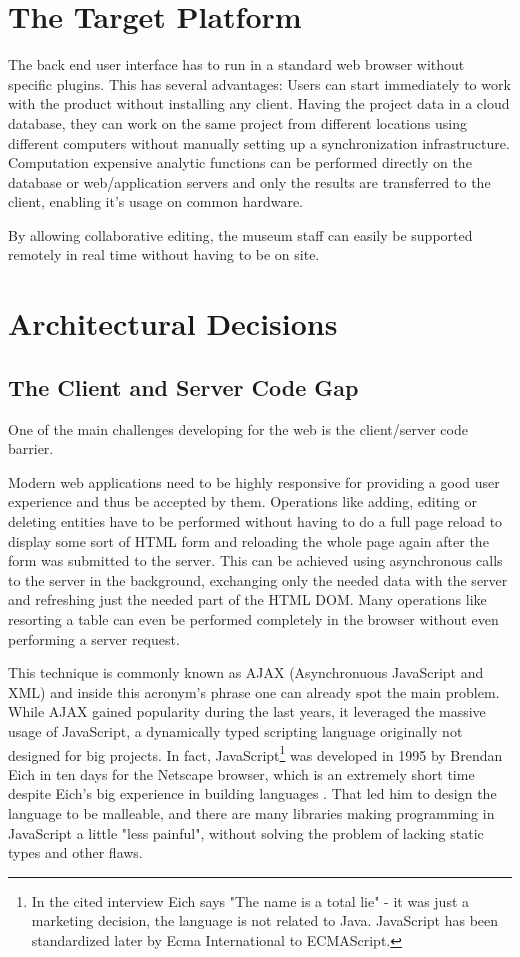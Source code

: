 
\section{The Target Platform}

The back end user interface has to run in a standard web browser without specific plugins. This has several advantages: Users can start immediately to work with the product without installing any client. Having the project data in a cloud database, they can work on the same project from different locations using different computers without manually setting up a synchronization infrastructure. Computation expensive analytic functions can be performed directly on the database or web/application servers and only the results are transferred to the client, enabling it's usage on common hardware.

By allowing collaborative editing, the museum staff can easily be supported remotely in real time without having to be on site.

\section{Architectural Decisions}

\subsection{The Client and Server Code Gap}
One of the main challenges developing for the web is the client/server code barrier. 

Modern web applications need to be highly responsive for providing a good user experience and thus be accepted by them. Operations like adding, editing or deleting entities have to be performed without having to do a full page reload to display some sort of HTML form and reloading the whole page again after the form was submitted to the server. This can be achieved using asynchronous calls to the server in the background, exchanging only the needed data with the server and refreshing just the needed part of the HTML DOM. Many operations like resorting a table can even be performed completely in the browser without even performing a server request.

This technique is commonly known as AJAX (Asynchronuous JavaScript and XML) and inside this acronym's phrase one can already spot the main problem. While AJAX gained popularity during the last years, it leveraged the massive usage of JavaScript, a dynamically typed scripting language originally not designed for big projects. In fact, JavaScript\footnote{In the cited interview Eich says "The name is a total lie" - it was just a marketing decision, the language is not related to Java. JavaScript has been standardized later by Ecma International to ECMAScript.} was developed in 1995 by Brendan Eich in ten days for the Netscape browser, which is an extremely short time despite Eich's big experience in building languages \cite{interview-eich}. That led him to design the language to be malleable, and there are many libraries making programming in JavaScript a little "less painful", without solving the problem of lacking static types and other flaws.

